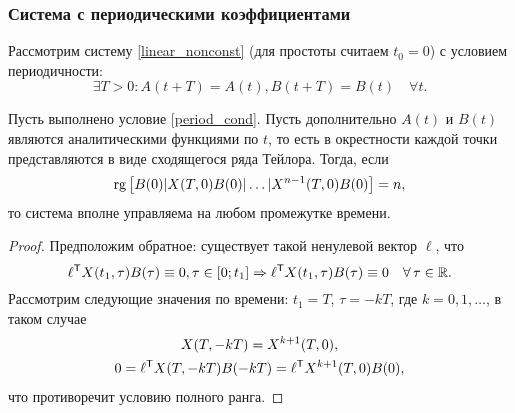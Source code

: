 \subsubsection{Система с периодическими коэффициентами}

Рассмотрим систему \eqref{linear_nonconst} (для простоты считаем $t_0 = 0$) с условием периодичности:
\begin{equation}
\label{period_cond}
  \exists T > 0 \colon A(t + T) = A(t), B(t + T) = B(t) \quad \forall t.
\end{equation}

\begin{theorem}
  Пусть выполнено условие \eqref{period_cond}. Пусть дополнительно $A(t)$ и $B(t)$
  являются аналитическими функциями по $t$, то есть в окрестности каждой точки представляются
  в виде сходящегося ряда Тейлора. Тогда, если
	\begin{equation*} 
		\operatorname{rg} \left[B(0) | X(T, 0) B(0) | \ldots | X^{n - 1}(T, 0) B(0)\right] = n, 
	\end{equation*}
	то система вполне управляема на любом промежутке времени.
\end{theorem}

\begin{proof}
	Предположим обратное: существует такой ненулевой вектор $\ell$, что
	\begin{equation*}
	  \ell^\tran X(t_1, \tau) B(\tau) \equiv 0, \tau \in [0; t_1] \Rightarrow
	  \ell^\tran X(t_1, \tau) B(\tau) \equiv 0 \quad \forall \tau \in \mathbb{R}.
  \end{equation*}
  Рассмотрим следующие значения по времени: $t_1 = T$, $\tau = -k T$, где $k = 0, 1, \ldots$, в таком случае
  \begin{gather*}
    X(T, -k T) = X^{k + 1}(T, 0),\\
    0 = \ell^{\mathsf{T}} X(T, -k T) B(-k T) = \ell^{\mathsf{T}} X^{k + 1}(T, 0) B(0),
  \end{gather*}
  что противоречит условию полного ранга.
\end{proof}